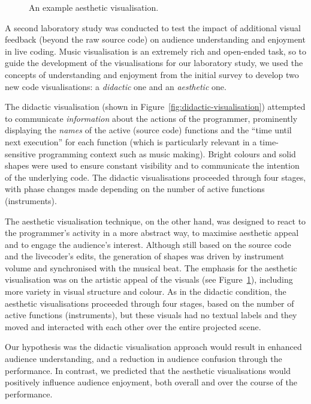 \documentclass{sig-alternate}
\begin{document}
\begin{figure}
\centering
{}
\caption{An example aesthetic visualisation.}
\label{fig:aesthetic-visualisation}
\end{figure}

A second laboratory study was conducted to test the impact of additional
visual feedback (beyond the raw source code) on audience understanding
and enjoyment in live coding. Music visualisation is an extremely rich
and open-ended task, so to guide the development of the visualisations
for our laboratory study, we used the concepts of understanding and enjoyment
from the initial survey to develop two new code visualisations: a
\emph{didactic} one and an \emph{aesthetic} one.

The didactic visualisation (shown in
Figure~\ref{fig:didactic-visualisation}) attempted to communicate
\emph{information} about the actions of the programmer, prominently
displaying the \emph{names} of the active (source code) functions and
the ``time until next execution'' for each function (which is
particularly relevant in a time-sensitive programming context such as
music making). Bright colours and solid shapes were used to ensure
constant visibility and to communicate the intention of the underlying
code. The didactic visualisations proceeded through four stages, with
phase changes made depending on the number of active functions
(instruments).

The aesthetic visualisation technique, on the other hand, was designed
to react to the programmer's activity in a more abstract way, to
maximise aesthetic appeal~\cite{Cawthon2007} and to engage the
audience's interest. Although still based on the source code and the
livecoder's edits, the generation of shapes was driven by instrument
volume and synchronised with the musical beat. The emphasis for the
aesthetic visualisation was on the artistic appeal of the visuals (see
Figure~\ref{fig:aesthetic-visualisation}), including more variety in
visual structure and colour. As in the didactic condition, the
aesthetic visualisations proceeded through four stages, based on the
number of active functions (instruments), but these visuals had no
textual labels and they moved and interacted with each other over the
entire projected scene.

Our hypothesis was the didactic visualisation approach would result in
enhanced audience understanding, and a reduction in audience confusion
through the performance. In contrast, we predicted that the aesthetic
visualisations would positively influence audience enjoyment, both
overall and over the course of the performance.
\end{document}
